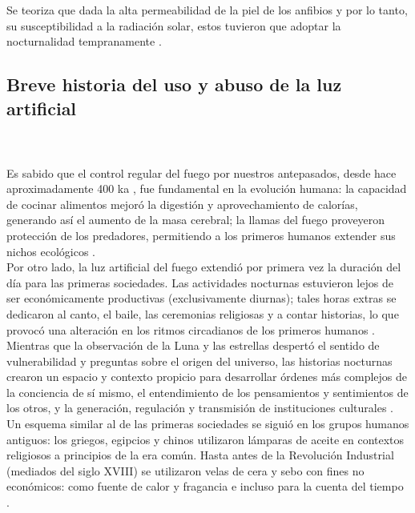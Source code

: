 Se teoriza que dada la alta permeabilidad de la piel de los anfibios y por lo tanto, su susceptibilidad a la radiación solar, estos tuvieron que adoptar la nocturnalidad tempranamente \citep{Holker2010}.

\newpage

\subsection{Breve historia del uso y abuso de la luz artificial}\\
\\

Es sabido que el control regular del fuego por nuestros antepasados, desde hace aproximadamente 400 ka \citep{Dunbar2014}, fue fundamental en la evolución humana: la capacidad de cocinar alimentos mejoró la digestión y aprovechamiento de calorías, generando así el aumento de la masa cerebral; la llamas del fuego proveyeron protección de los predadores, permitiendo a los primeros humanos extender sus nichos ecológicos \citep{Wrangham2010}.\\

Por otro lado, la luz artificial del fuego extendió por primera vez la duración del día para las primeras sociedades. Las actividades nocturnas estuvieron lejos de ser económicamente productivas (exclusivamente diurnas); tales horas extras se dedicaron al canto, el baile, las ceremonias religiosas y a contar historias, lo que provocó una alteración en los ritmos circadianos de los primeros humanos \citep{Wiessner2014}.\\

Mientras que la observación de la Luna y las estrellas despertó el sentido de vulnerabilidad y preguntas sobre el origen del universo, las historias nocturnas crearon un espacio y contexto propicio para desarrollar órdenes más complejos de la conciencia de sí mismo, el entendimiento de los pensamientos y sentimientos de los otros, y la generación, regulación y transmisión de instituciones culturales \citep{Wiessner2014}.\\

Un esquema similar al de las primeras sociedades se siguió en los grupos humanos antiguos: los griegos, egipcios y chinos utilizaron lámparas de aceite en contextos religiosos a principios de la era común. Hasta antes de la Revolución Industrial (mediados del siglo XVIII) se utilizaron velas de cera y sebo con fines no económicos: como fuente de calor y fragancia e incluso para la cuenta del tiempo \citep{Duvall1988}.\\

